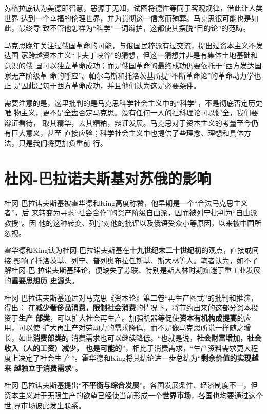 苏格拉底认为美德即智慧，恶源于无知，试图将德性等同于客观规律，借此让人类世界
达到一个幸福的伦理世界，并为贯彻这一信念而殉葬。马克思很可能也是如此，最终导
致不管他怎样为“科学”一词辩护，这都使其摆脱“目的论”的范畴。

马克思晚年关注过俄国革命的可能，与俄国民粹派有过交流，提出过资本主义不发达国
家跨越资本主义“卡夫丁峡谷”的猜想，但这一猜想并非是有集体土地基础和意识的俄
国可以独立革命成功；而是俄国革命的最终成功仍要依托于“西方发达国家无产阶级革
命的呼应”。\cite{mamincui}帕尔乌斯和托洛茨基所提“不断革命论”的革命动力学也正
是因此建筑于西方革命成功，并且他们认为这是必要条件。

需要注意的是，这里批判的是马克思科学社会主义中的“科学”，不是彻底否定历史唯
物主义，更不是全盘否定马克思。没有任何一人的社科理论可以健全，我们要辩证看待，
取其精华，去其糟粕，辩证发展。马克思对于资本主义的考量至今仍有巨大意义，甚至
直接应验；科学社会主义中也提供了些理念、理想和具体方法，只是我们将更加负重前
行。

\section{杜冈-巴拉诺夫斯基对苏俄的影响}

杜冈-巴拉诺夫斯基被霍华德和King高度称赞，他早期是一个“合法马克思主义者”，后
来转变为寻求“社会合作”的资产阶级自由派，因而被列宁批判为“自由派教授”。因
他的这种转变、列宁对他的批评以及俄语受众小等原因，以来被中国所忽视。

霍华德和King认为杜冈-巴拉诺夫斯基在\textbf{十九世纪末二十世纪初}的观点，直接或间接
影响了托洛茨基、列宁、普列奥布拉任斯基、斯大林等人。笔者认为，如不了解杜冈-巴
拉诺夫斯基理论，便缺失了苏联、特别是斯大林时期痴迷于重工业发展的\textbf{重要思想历
  史源头}。

杜冈-巴拉诺夫斯基通过对马克思《资本论》第二卷“再生产图式”的批判和推演，得出：
在\textbf{减少奢侈品消费，限制社会消费}的情况下，将节约出来的这部分资本投资于\textbf{生产
  部类}，可以扩大社会再生产。加强机器等促使\textbf{资本有机构成提高}的应用，可以使
扩大再生产对劳动力的需求降低，而不是像马克思所说一样随之增长，如此\textbf{消费部类}的
消费需求也可以继续降低。“也就是说，\textbf{社会财富增加，社会收入（人的工资）减少，
  也是可能的}”，相比于消费需求，“生产资料需求更大程度上决定了社会生
产”。\cite{lijingdugang}霍华德和King将其结论进一步总结为“\textbf{剩余价值的实现越来
  越独立于消费需求}”。

杜冈-巴拉诺夫斯基提出“\textbf{不平衡与综合发展}”。各国发展条件、经济制度不一，但
资本主义对于无限生产的欲望已经使当前形成一个\textbf{世界市场}，各国也均要通过这个世
界市场彼此发生联系。

